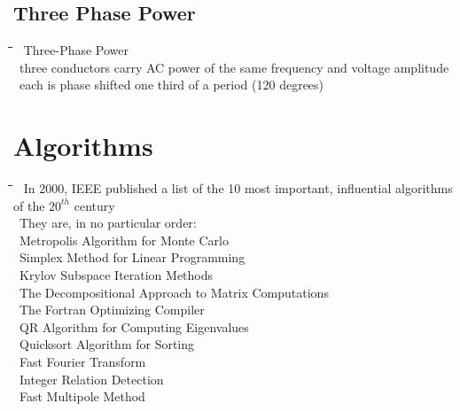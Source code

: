 \documentclass[10pt,letterpaper]{scrartcl}
\newcommand{\tbul}{\textbullet}
\newcommand{\tend}{\>\textendash}
\newcommand{\tasc}{\>\>\textasteriskcentered}
\newcommand{\tabDef}{\hspace{2em}\=\hspace{2em}\=\hspace{2em}\=\hspace{2em}\=\kill}
\begin{document}
\subsection{Three Phase Power}
\begin{tabbing}\tabDef 
	\tbul\ Three-Phase Power \\
	\tend\ three conductors carry AC power of the same frequency and voltage amplitude \\
	\tasc\ each is phase shifted one third of a period (120 degrees)
\end{tabbing}

\newpage 
\section{Algorithms}
\begin{tabbing}\tabDef
	\tbul\ In 2000, IEEE published a list of the 10 most important, influential algorithms of the $20^{th}$ century \\
	\tbul\ They are, in no particular order: \\
	\tend\ Metropolis Algorithm for Monte Carlo \\
	\tend\ Simplex Method for Linear Programming \\
	\tend\ Krylov Subspace Iteration Methods\\
	\tend\ The Decompositional Approach to Matrix Computations \\
	\tend\ The Fortran Optimizing Compiler\\
	\tend\ QR Algorithm for Computing Eigenvalues\\
	\tend\ Quicksort Algorithm for Sorting \\
	\tend\ Fast Fourier Transform \\
	\tend\ Integer Relation Detection\\
	\tend\ Fast Multipole Method
\end{tabbing}
\end{document}
